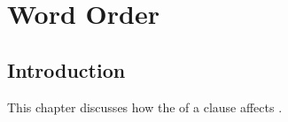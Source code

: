 \chapter{Word Order}\label{WordOrder}






%





\section{Introduction}\label{WO:Intro}

This chapter discusses how the  of a clause affects
.

